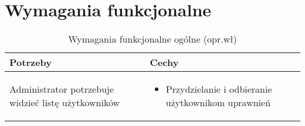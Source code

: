 \section{Wymagania funkcjonalne}

\begin{minipage}{\textwidth}
    \begin{table}[H]
        \centering\caption{Wymagania funkcjonalne ogólne (opr.wł)\label{tabela:wymaganiaFunkcjonalneOgolne}}
        \begin{tabular}{|P{.3\textwidth}|P{.6\textwidth}|}
            \hline
            Potrzeby & Cechy \\

            \hline
            Administrator potrzebuje widzieć listę użytkowników &
            \begin{itemize}
                \item Przydzielanie i odbieranie użytkownikom uprawnień
            \end{itemize} \\
            \hline
        \end{tabular}
    \end{table}
\end{minipage}

